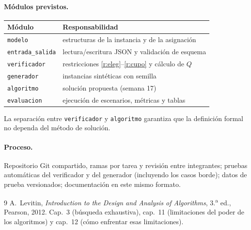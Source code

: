 \documentclass[11pt,letterpaper]{article}
\theoremstyle{definition}
\theoremstyle{remark}
\theoremstyle{plain}
\begin{document}
\paragraph{Módulos previstos.}
\begin{center}
\small
\begin{tabular}{ll}
\toprule
Módulo & Responsabilidad \\
\midrule
\texttt{modelo} & estructuras de la instancia y de la asignación \\
\texttt{entrada\_salida} & lectura/escritura JSON y validación de esquema \\
\texttt{verificador} & restricciones \ref{r:eleg}--\ref{r:cupo} y cálculo de $Q$ \\
\texttt{generador} & instancias sintéticas con semilla \\
\texttt{algoritmo} & solución propuesta (semana 17) \\
\texttt{evaluacion} & ejecución de escenarios, métricas y tablas \\
\bottomrule
\end{tabular}
\end{center}
La separación entre \texttt{verificador} y \texttt{algoritmo} garantiza que
la definición formal no dependa del método de solución.

\paragraph{Proceso.}
Repositorio Git compartido, ramas por tarea y revisión entre integrantes;
pruebas automáticas del verificador y del generador (incluyendo los casos
borde); datos de prueba versionados; documentación en este mismo formato.

\begin{thebibliography}{9}
 A.~Levitin, \emph{Introduction to the Design and Analysis of
  Algorithms}, 3.\textsuperscript{a} ed., Pearson, 2012. Cap.~3 (búsqueda
  exhaustiva), cap.~11 (limitaciones del poder de los algoritmos) y cap.~12
  (cómo enfrentar esas limitaciones).
\end{thebibliography}
\end{document}

